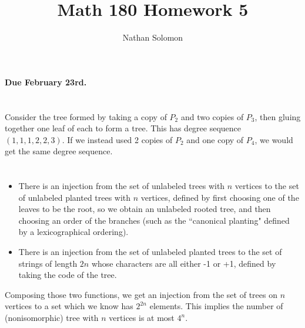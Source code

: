 \documentclass[12pt]{article}
\begin{document}
\title{Math 180 Homework 5}
\author{Nathan Solomon}
\maketitle

\textbf{Due February 23rd.}

\section{}
\noindent{}\bigskip\par
Consider the tree formed by taking a copy of $P_2$ and two copies of $P_3$, then gluing together one leaf of each to form a tree. This has degree sequence $(1,1,1,2,2,3)$. If we instead used 2 copies of $P_2$ and one copy of $P_4$, we would get the same degree sequence.

\section{}
\noindent{}\bigskip\par
\begin{itemize}
    \item There is an injection from the set of unlabeled trees with $n$ vertices to the set of unlabeled planted trees with $n$ vertices, defined by first choosing one of the leaves to be the root, so we obtain an unlabeled rooted tree, and then choosing an order of the branches (such as the ``canonical planting" defined by a lexicographical ordering).
    \item There is an injection from the set of unlabeled planted trees to the set of strings of length $2n$ whose characters are all either -1 or +1, defined by taking the code of the tree.
\end{itemize}
Composing those two functions, we get an injection from the set of trees on $n$ vertices to a set which we know has $2^{2n}$ elements. This implies the number of (nonisomorphic) tree with $n$ vertices is at most $4^n$.
\end{document}
